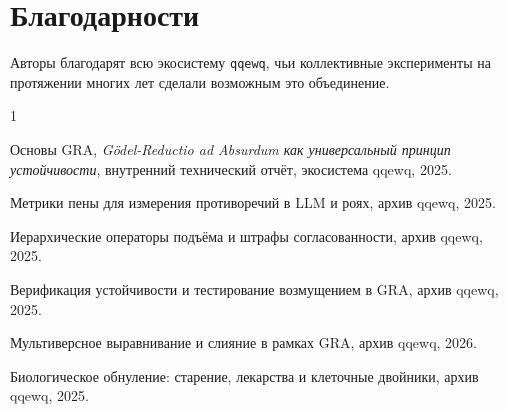 \documentclass[11pt,a4paper]{article}
\begin{document}
\section*{Благодарности}
Авторы благодарят всю экосистему \texttt{qqewq}, чьи коллективные эксперименты на протяжении многих лет сделали возможным это объединение.

\begin{thebibliography}{1}

Основы GRA, \textit{Gödel-Reductio ad Absurdum как универсальный принцип устойчивости}, внутренний технический отчёт, экосистема qqewq, 2025.

Метрики пены для измерения противоречий в LLM и роях, архив qqewq, 2025.

Иерархические операторы подъёма и штрафы согласованности, архив qqewq, 2025.

Верификация устойчивости и тестирование возмущением в GRA, архив qqewq, 2025.

Мультиверсное выравнивание и слияние в рамках GRA, архив qqewq, 2026.

Биологическое обнуление: старение, лекарства и клеточные двойники, архив qqewq, 2025.

\end{thebibliography}
\end{document}
